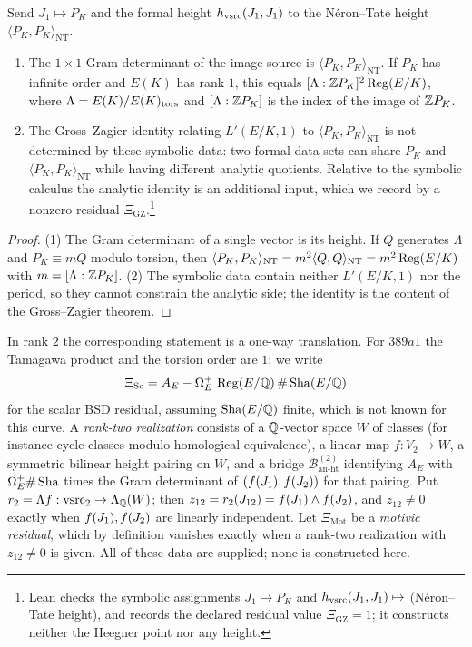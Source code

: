 \begin{theorem}\label{thm:apparatus:vsrc-stage-ii-gz-partial}
Send $J_1\mapsto P_K$ and the formal height $h_{\mathrm{vsrc}}(J_1,J_1)$ to the
N\'eron--Tate height $\langle P_K,P_K\rangle_{\mathrm{NT}}$.
\begin{enumerate}
\item The $1\times1$ Gram determinant of the image source is
  $\langle P_K,P_K\rangle_{\mathrm{NT}}$.  If $P_K$ has infinite order and
  $E(K)$ has rank $1$, this equals $[\Lambda:\mathbb{Z} P_K]^2\operatorname{Reg}(E/K)$, where
  $\Lambda=E(K)/E(K)_{\operatorname{tors}}$ and $[\Lambda:\mathbb{Z} P_K]$ is the index of the
  image of $\mathbb{Z} P_K$.
\item The Gross--Zagier identity relating $L'(E/K,1)$ to
  $\langle P_K,P_K\rangle_{\mathrm{NT}}$ is not determined by these
  symbolic data: two formal data sets can share $P_K$ and
  $\langle P_K,P_K\rangle_{\mathrm{NT}}$ while having different analytic
  quotients.  Relative to the symbolic calculus the analytic identity is an
  additional input, which we record by a nonzero residual
  $\Xi_{\mathrm{GZ}}$.\footnote{Lean checks the symbolic assignments $J_1\mapsto P_K$ and
$h_{\mathrm{vsrc}}(J_1,J_1)\mapsto$ (N\'eron--Tate height), and records the
declared residual value $\Xi_{\mathrm{GZ}}=1$; it constructs neither the
Heegner point nor any height.}
\end{enumerate}
\end{theorem}

\begin{proof}
(1) The Gram determinant of a single vector is its height.  If $Q$
generates $\Lambda$ and $P_K\equiv mQ$ modulo torsion, then
$\langle P_K,P_K\rangle_{\mathrm{NT}}=m^2\langle Q,Q\rangle_{\mathrm{NT}}
=m^2\operatorname{Reg}(E/K)$ with $m=[\Lambda:\mathbb{Z} P_K]$.  (2) The symbolic data contain
neither $L'(E/K,1)$ nor the period, so they cannot constrain the analytic
side; the identity is the content of the Gross--Zagier theorem.
\end{proof}

In rank $2$ the corresponding statement is a one-way translation.  For
$389a1$ the Tamagawa product and the torsion order are $1$; we write
\[
  \Xi_{\mathrm{Sc}}
  =A_E-\Omega_E^+\,\operatorname{Reg}(E/\mathbb{Q})\,\#\operatorname{Sha}(E/\mathbb{Q})
\]
for the scalar BSD residual, assuming $\operatorname{Sha}(E/\mathbb{Q})$ finite, which is not
known for this curve.  A \emph{rank-two realization} consists of a
$\mathbb{Q}$-vector space $W$ of classes (for instance cycle classes modulo
homological equivalence), a linear map $f:V_2\to W$, a symmetric
bilinear height pairing on $W$, and a bridge
$\mathcal B^{(2)}_{\mathrm{an\text{-}ht}}$ identifying $A_E$ with
$\Omega_E^+\#\operatorname{Sha}$ times the Gram determinant of $(f(J_1),f(J_2))$
for that pairing.  Put $r_2=\Lambda f:\mathrm{vsrc}_2\to\Lambda_{\mathbb{Q}}(W)$; then
$z_{12}=r_2(J_{12})=f(J_1)\wedge f(J_2)$, and $z_{12}\neq0$ exactly
when $f(J_1),f(J_2)$ are linearly independent.  Let
$\Xi_{\mathrm{Mot}}$ be a \emph{motivic residual}, which by definition
vanishes exactly when a rank-two realization with $z_{12}\neq0$ is given.
All of these data are supplied; none is constructed here.

